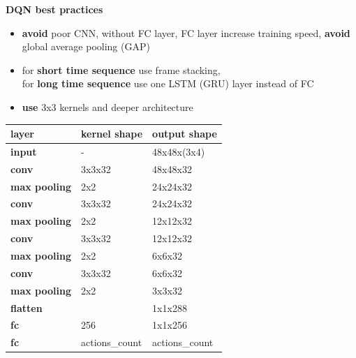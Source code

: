 \documentclass[xcolor=dvipsnames]{beamer}
\begin{document}
\begin{frame}{\bf DQN best practices}
\vspace{-4mm}

{\small
\begin{itemize}
  \item {\color{red} \bf avoid} poor CNN, without FC layer, FC layer increase training speed, {\color{red} \bf avoid} global average pooling (GAP)
  \item for {\color{green} \bf short time sequence} use frame stacking, \\ for {\color{green} \bf long time sequence} use one LSTM (GRU) layer instead of FC
  \item {\color{green} \bf use} 3x3 kernels and deeper architecture
\end{itemize}
}

{\small

    \begin{table}[]
    \begin{tabular}{|l|l|l|}
    \hline
    \textbf{layer}       & \textbf{kernel shape} & \textbf{output shape} \\ \hline
    \rowcolor[HTML]{C0C0C0}
    \textbf{input}       & -                    & 48x48x(3x4)          \\ \hline
    \rowcolor[HTML]{FD6864}
    \textbf{conv}        & 3x3x32               & 48x48x32             \\ \hline
    \rowcolor[HTML]{9698ED}
    \textbf{max pooling} & 2x2                  & 24x24x32             \\ \hline
    \rowcolor[HTML]{FD6864}
    \textbf{conv}        & 3x3x32               & 24x24x32             \\ \hline
    \rowcolor[HTML]{9698ED}
    \textbf{max pooling} & 2x2                  & 12x12x32             \\ \hline
    \rowcolor[HTML]{FD6864}
    \textbf{conv}        & 3x3x32               & 12x12x32             \\ \hline
    \rowcolor[HTML]{9698ED}
    \textbf{max pooling} & 2x2                  & 6x6x32               \\ \hline
    \rowcolor[HTML]{FD6864}
    \textbf{conv}        & 3x3x32               & 6x6x32               \\ \hline
    \rowcolor[HTML]{9698ED}
    \textbf{max pooling} & 2x2                  & 3x3x32               \\ \hline
    \rowcolor[HTML]{C0C0C0}
    \textbf{flatten}     &                      & 1x1x288              \\ \hline
    \rowcolor[HTML]{67FD9A}
    \textbf{fc}          & 256                  & 1x1x256              \\ \hline
    \rowcolor[HTML]{67FD9A}
    \textbf{fc}          & actions\_count       & actions\_count       \\ \hline
    \end{tabular}
    \end{table}



}

\end{frame}
\end{document}
